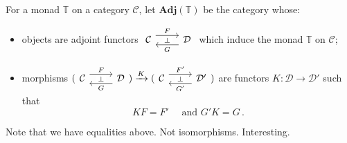 \documentclass[a4paper,11pt]{article}
\theoremstyle{break_italics}
\theoremstyle{break_upright}
\theoremstyle{remark}
\newcommand{\C}{\mathcal{C}}
\newcommand{\D}{\mathcal{D}}
\begin{document}
For a monad $\mathbb T$ on a category $\C$, let $\mathbf{Adj}(\mathbb T)$ be the category whose:
\begin{itemize}
	\item objects are adjoint functors $\begin{tikzcd}
	\C & \D
	\arrow["\bot"{description}, draw=none, from=1-1, to=1-2]
	\arrow["F", shift left=2, from=1-1, to=1-2]
	\arrow["G", shift left=2, from=1-2, to=1-1]
\end{tikzcd}$ which induce the monad $\mathbb T$ on $\C$;
	\item morphisms $(\begin{tikzcd}
	\C & \D
	\arrow["\bot"{description}, draw=none, from=1-1, to=1-2]
	\arrow["F", shift left=2, from=1-1, to=1-2]
	\arrow["G", shift left=2, from=1-2, to=1-1]
\end{tikzcd}) \xrightarrow{K} (\begin{tikzcd}
	\C & \D'
	\arrow["\bot"{description}, draw=none, from=1-1, to=1-2]
	\arrow["F'", shift left=2, from=1-1, to=1-2]
	\arrow["G'", shift left=2, from=1-2, to=1-1]
\end{tikzcd})$ are functors $K \colon \D \to \D'$ such that
\[
	KF = F' \quad \text{ and } G'K = G\,.
\]
\end{itemize}
Note that we have equalities above. Not isomorphisms. Interesting.
\end{document}
